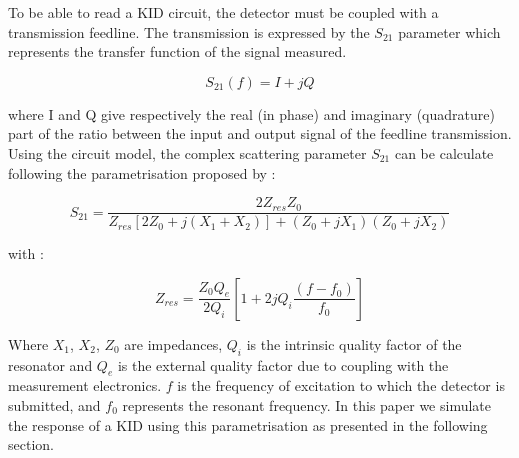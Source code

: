 To be able to read a KID circuit, the detector must be coupled with a transmission feedline. The transmission is expressed by the $S_{21}$ parameter which represents the transfer function of the signal measured. 

\begin{equation}
S_{21}(f) = I +jQ
\end{equation}

where I and Q give respectively the real (in phase) and imaginary (quadrature) part of the ratio between the input and output signal of the feedline transmission. \\

Using the circuit model, the complex scattering parameter $S_{21}$ can be calculate following the parametrisation proposed by \citet{2008ApPhL..93m4102G} :

\begin{equation}
S_{21} = \frac{2Z_{res}Z_{0}}{Z_{res}[2Z_{0} + j(X_{1}+X_{2})] + (Z_{0} +jX_{1})(Z_{0} +jX_{2})}
\end{equation}

with :

\begin{equation}
Z_{res} = \frac{Z_{0}Q_{e}}{2Q_{i}}[1 + 2jQ_{i}\frac{(f-f_{0})}{f_{0}}]
\end{equation}

Where $X_{1}$, $X_{2}$, $Z_{0}$ are impedances, $Q_{i}$ is the intrinsic quality factor of the resonator and $Q_{e}$ is the external quality factor due to coupling with the measurement electronics. $f$ is the frequency of excitation to which the detector is submitted, and $f_{0}$ represents the resonant frequency. In this paper we simulate the response of a KID using this parametrisation as presented in the following section.


 


